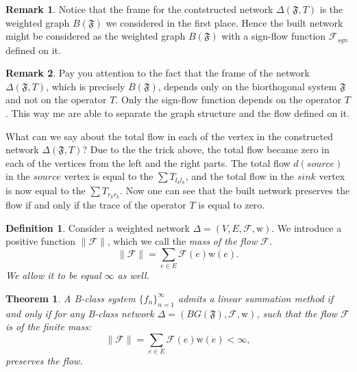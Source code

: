 \documentclass[12pt]{article}
\newtheorem{theorem}{Theorem}
\theoremstyle{definition}
\newtheorem{remark}{Remark}
\newtheorem{definition}{Definition}
\newcommand{\seq}[1]{\{{#1}_n\}_{n=1}^\infty}
\newcommand{\fsys}{\mathfrak{F}}
\newcommand{\wt}{\mathrm{w}}
\newcommand{\flow}{\mathcal{F}}
\newcommand{\flowsgn}{\mathcal{F}_{sgn}}
\newcommand{\source}{\mathit{source}}
\newcommand{\sink}{\mathit{sink}}
\newcommand{\net}{\Delta}
\numberwithin{remark}{section}
\numberwithin{theorem}{section}
\numberwithin{prop}{section}
\numberwithin{equation}{section}
\numberwithin{lemma}{section}
\numberwithin{prop_under_lemma}{lemma}
\begin{document}
    \begin{remark}
      Notice that the frame for the contstructed network $\net(\fsys, T)$ is the weighted graph $B(\fsys)$
      we considered in the first place.
      Hence the built network might be considered as the weighted graph $B(\fsys)$ with a sign-flow function
      $\flowsgn$ defined on it.
    \end{remark}
    \begin{remark}
      Pay you attention to the fact that the frame of the network $\net(\fsys, T)$, which is precisely $B(\fsys)$,
      depends only on the biorthogonal system $\fsys$ and not on the operator $T$.
      Only the sign-flow function depends on the operator $T$.
      This way me are able to separate the graph structure and the flow defined on it.
    \end{remark}
    What can we say about the total flow in each of the vertex in the constructed network $\net(\fsys, T)$?
    Due to the the trick above, the total flow became zero in each of the vertices from the left and the right parts.
    The total flow $d(\source)$ in the $\source$ vertex is equal to the $\sum T_{l_k l_k}$, and the total flow in the
    $\sink$ vertex is now equal to the $\sum T_{r_k r_k}$.
    Now one can see that the built network preserves the flow if and only if the trace of the operator $T$ is equal to
    zero.
    \begin{definition}
      Consider a weighted network $\net = (V, E, \flow, \wt)$.
      We introduce a positive function $\|\flow\|$, which we call the \it{mass of the flow} $\flow$.
      $$
        \|\flow\| = \sum_{e \in E} \flow(e) \wt(e).
      $$
      We allow it to be equal $\infty$ as well.
    \end{definition}
    \begin{theorem}
      \label{thm-graph-eq}
        A B-class system $\seq{f}$ admits a linear summation method if and only if for any 
        B-class network $\net = (BG(\fsys), \flow, \wt)$, such that the flow $\flow$ is of the finite mass:
        $$
          \|\flow\| = \sum_{e \in E} \flow(e) \wt(e) < \infty,
        $$
        preserves the flow.
    \end{theorem}
\end{document}
